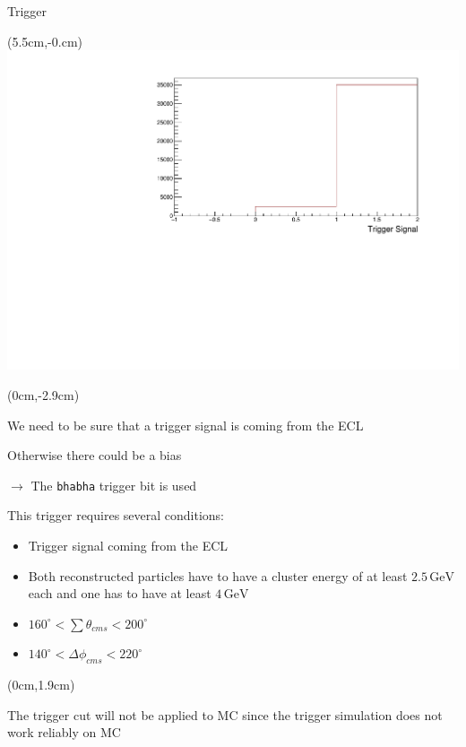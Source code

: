 \documentclass[8pt]{beamer}
\begin{document}
\begin{frame}{Trigger}
	
	\begin{textblock*}{6.5cm}(5.5cm,-0.cm)
		\includegraphics[width=\textwidth]{VBilder/DataTrigger}
	\end{textblock*}
	
	
	
	
	
	\begin{textblock*}{11cm}(0cm,-2.9cm)
		
		We need to be sure that a trigger signal is coming from the ECL 
		
		Otherwise there could be a bias
		
		$\rightarrow$ The \texttt{bhabha} trigger bit is used
		
		This trigger requires several conditions:
		\begin{itemize}
			\item Trigger signal coming from the ECL
			\item Both reconstructed particles have to have a cluster energy of at least $2.5\,\textrm{GeV}$ each and one has to have at least $4\,\textrm{GeV}$
			\item $160^{\circ} < \sum \theta_{cms} < 200^{\circ}$
			\item $140^{\circ} < \Delta \phi_{cms} < 220^{\circ}$
			
		\end{itemize}
		
	\end{textblock*}
	
	
	
	
	\begin{textblock*}{5.5cm}(0cm,1.9cm)
		
		The trigger cut will not be applied to MC since the trigger simulation does not work reliably on MC 
	\end{textblock*}
\end{frame}
\end{document}
